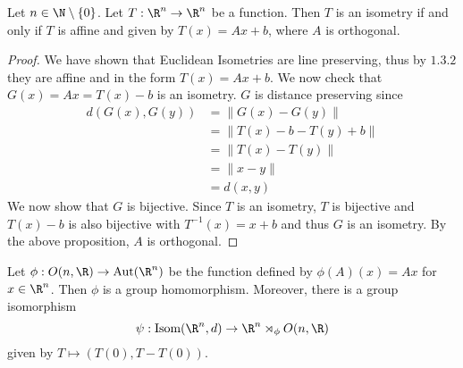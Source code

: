 \documentclass[a4paper]{article}
\begin{document}
\begin{prp}{}{} Let $n\in\N\setminus\{0\}$. Let $T:\R^n\to\R^n$ be a function. Then $T$ is an isometry if and only if $T$ is affine and given by $T(x)=Ax+b$, where $A$ is orthogonal. \tcbline
\begin{proof} We have shown that Euclidean Isometries are line preserving, thus by $1.3.2$ they are affine and in the form $T(x)=Ax+b$. We now check that $G(x)=Ax=T(x)-b$ is an isometry. $G$ is distance preserving since
\begin{align*}
d(G(x),G(y))&=\|G(x)-G(y)\|\\
&=\|T(x)-b-T(y)+b\|\\
&=\|T(x)-T(y)\|\\
&=\|x-y\|\tag{$T$ is an isometry}\\
&=d(x,y)
\end{align*}
We now show that $G$ is bijective. Since $T$ is an isometry, $T$ is bijective and $T(x)-b$ is also bijective with $T^{-1}(x)=x+b$ and thus $G$ is an isometry. By the above proposition, $A$ is orthogonal. 
\end{proof}
\end{prp}

\begin{prp}{}{} Let $\phi:O(n,\R)\to\text{Aut}(\R^n)$ be the function defined by $\phi(A)(x)=Ax$ for $x\in\R^n$. Then $\phi$ is a group homomorphism. Moreover, there is a group isomorphism $$\psi:\text{Isom}(\R^n,d)\to \R^n\rtimes_\phi O(n,\R)$$ given by $T\mapsto(T(0),T-T(0))$. 
\end{prp}
\end{document}
